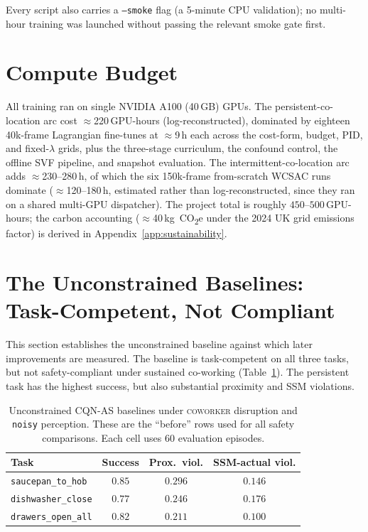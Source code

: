 \documentclass[11pt,a4paper]{report}
\newcommand{\ssm}{SSM}
\newcommand{\cqnas}{CQN-AS}
\newcommand{\coworker}{\textsc{coworker}}
\begin{document}
\label{sec:setup:smoke}%
Every script also carries a \texttt{--smoke} flag (a 5-minute CPU
validation); no multi-hour training was launched without passing the
relevant smoke gate first.

\section{Compute Budget}
\label{sec:setup:compute}

All training ran on single NVIDIA A100 (40\,GB) GPUs. The
persistent-co-location arc cost $\approx$220\,GPU-hours
(log-reconstructed), dominated by eighteen 40k-frame Lagrangian
fine-tunes at $\approx$9\,h each across the cost-form, budget, PID,
and fixed-$\lambda$ grids, plus the three-stage curriculum, the
confound control, the offline SVF pipeline, and snapshot evaluation.
The intermittent-co-location arc adds $\approx$230--280\,h, of which
the six 150k-frame from-scratch WCSAC runs dominate
($\approx$120--180\,h, estimated rather than log-reconstructed,
since they ran on a shared multi-GPU dispatcher). The project total
is roughly $450$--$500$\,GPU-hours; the carbon accounting
($\approx$40\,kg~CO\textsubscript{2}e under the 2024 UK grid
emissions factor) is derived in Appendix~\ref{app:sustainability}.


\section{The Unconstrained Baselines: Task-Competent, Not Compliant}
\label{sec:results:baseline}

This section establishes the unconstrained baseline against which later
improvements are measured. The baseline is task-competent on all three
tasks, but not safety-compliant under sustained co-working
(Table~\ref{tab:results:baseline}). The persistent task has the
highest success, but also substantial proximity and \ssm{} violations.

\begin{table}[H]
\centering
\caption{Unconstrained \cqnas{} baselines under \coworker{} disruption
and \texttt{noisy} perception. These are the ``before'' rows used for
all safety comparisons. Each cell uses 60 evaluation episodes.}
\label{tab:results:baseline}
\small
\begin{tabular}{lccc}
\toprule
Task & Success & Prox.\ viol. & \ssm{}-actual viol. \\
\midrule
\texttt{saucepan\_to\_hob}      & $0.85$ & $0.296$ & $0.146$ \\
\texttt{dishwasher\_close}      & $0.77$ & $0.246$ & $0.176$ \\
\texttt{drawers\_open\_all}     & $0.82$ & $0.211$ & $0.100$ \\
\bottomrule
\end{tabular}
\end{table}
\end{document}
